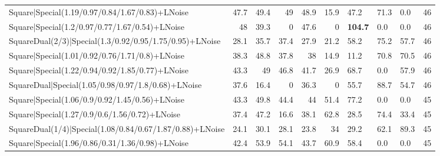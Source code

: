 \begin{tabular}{lrrrrrlllr}
 Square|Special(1.19/0.97/0.84/1.67/0.83)+LNoise                 &            47.7 &            49.4 &            49   &            48.9 &           15.9 & 47.2            & 71.3           & 0.0            &           46 \\
 Square|Special(1.2/0.97/0.77/1.67/0.54)+LNoise                  &            48   &            39.3 &             0   &            47.6 &            0   & \textbf{104.7}  & 0.0            & 0.0            &           46 \\
 SquareDual(2/3)|Special(1.3/0.92/0.95/1.75/0.95)+LNoise         &            28.1 &            35.7 &            37.4 &            27.9 &           21.2 & 58.2            & 75.2           & 57.7           &           46 \\
 Square|Special(1.01/0.92/0.76/1.71/0.8)+LNoise                  &            38.3 &            48.8 &            37.8 &            38   &           14.9 & 11.2            & 70.8           & 70.5           &           46 \\
 Square|Special(1.22/0.94/0.92/1.85/0.77)+LNoise                 &            43.3 &            49   &            46.8 &            41.7 &           26.9 & 68.7            & 0.0            & 57.9           &           46 \\
 SquareDual|Special(1.05/0.98/0.97/1.8/0.68)+LNoise              &            37.6 &            16.4 &             0   &            36.3 &            0   & 55.7            & 88.7           & 54.7           &           46 \\
 Square|Special(1.06/0.9/0.92/1.45/0.56)+LNoise                  &            43.3 &            49.8 &            44.4 &            44   &           51.4 & 77.2            & 0.0            & 0.0            &           45 \\
 Square|Special(1.27/0.9/0.6/1.56/0.72)+LNoise                   &            37.4 &            47.2 &            16.6 &            38.1 &           62.8 & 28.5            & 74.4           & 33.4           &           45 \\
 SquareDual(1/4)|Special(1.08/0.84/0.67/1.87/0.88)+LNoise        &            24.1 &            30.1 &            28.1 &            23.8 &           34   & 29.2            & 62.1           & 89.3           &           45 \\
 Square|Special(1.96/0.86/0.31/1.36/0.98)+LNoise                 &            42.4 &            53.9 &            54.1 &            43.7 &           60.9 & 58.4            & 0.0            & 0.0            &           45 \\

\end{tabular}
